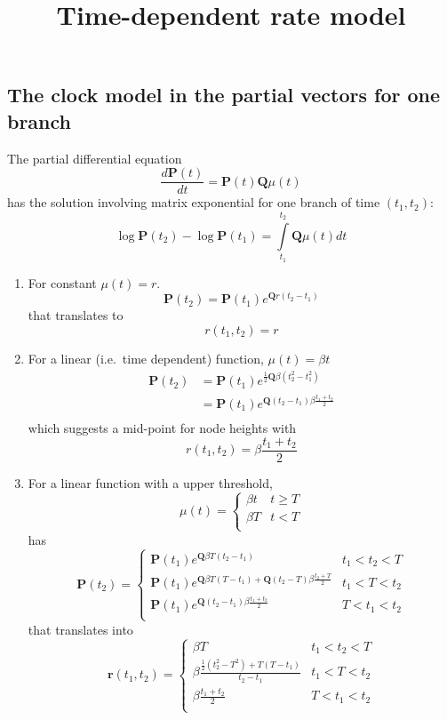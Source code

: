 \documentclass[12pt]{article} %
\newcommand{\vecc}[1]{\mathbf{#1}}
\begin{document}
\title{Time-dependent rate model}

\maketitle

\subsection*{The clock model in the partial vectors for one branch}
The partial differential equation
$$
\frac{d \vecc{P}(t)}{dt} = \vecc{P}(t) \vecc{Q} \mu(t)
$$
has the solution involving matrix exponential for one branch of time $(t_1, t_2)$:
$$
\log \vecc{P}(t_2) - \log \vecc{P}(t_1) = \int\limits_{t_1}^{t_2} \vecc{Q}\mu(t)dt
$$
\begin{enumerate}
	\item For constant $\mu(t) = r$.
	$$
	\vecc{P}(t_2) = \vecc{P}(t_1) e^{\vecc{Q}r(t_2 - t_1)}
	$$
	that translates to
	$$
	r(t_1, t_2) = r
	$$
	\item For a linear (i.e.~time dependent) function, $\mu(t) = \beta t$
	$$
	\begin{aligned}
		\vecc{P}(t_2) &= \vecc{P}(t_1) e^{\frac{1}{2} \vecc{Q}\beta(t_2^2 - t_1^2)}\\
		&= \vecc{P}(t_1) e^{ \vecc{Q}(t_2 - t_1) \beta \frac{t_1 + t_2}{2}}\\
	\end{aligned}
	$$
	which suggests a mid-point for node heights with
	$$
	r(t_1, t_2) = \beta \frac{t_1 + t_2}{2}
	$$
	\item For a linear function with a upper threshold,
	$$
	\mu(t) = \left\{ \begin{array}{cc}
		\beta t & t \ge T\\
		\beta T & t < T\\
	\end{array} \right.
   $$
   has 
   $$
   \vecc{P}(t_2) = \left\{ \begin{array}{cc}
   	\vecc{P}(t_1)e^{\vecc{Q}\beta T (t_2 - t_1)} & t_1 < t_2 < T\\
   	\vecc{P}(t_1)e^{\vecc{Q}\beta T (T - t_1) + \vecc{Q}(t_2 - T)\beta \frac{t_2 + T}{2}} & t_1 < T < t_2\\
   	\vecc{P}(t_1)e^{\vecc{Q} (t_2 - t_1) \beta \frac{t_1 + t_2}{2}} & T < t_1 < t_2 \\
   \end{array} \right.
   $$
   that translates into
   $$
   \vecc{r}(t_1, t_2) = \left\{ \begin{array}{cc}
   	\beta T & t_1 < t_2 < T\\
   	\beta \frac{\frac{1}{2}(t_2^2 - T^2) + T(T - t_1)}{t_2 - t_1} & t_1 < T < t_2\\
   	\beta \frac{t_1 + t_2}{2} & T < t_1 < t_2 \\
   	\end{array} \right.
   $$
\end{enumerate}
\end{document}

